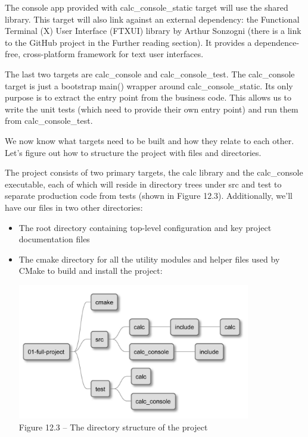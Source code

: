 The console app provided with calc\_console\_static target will use the shared library. This target will also link against an external dependency: the Functional Terminal (X) User Interface (FTXUI) library by Arthur Sonzogni (there is a link to the GitHub project in the Further reading section). It provides a dependence-free, cross-platform framework for text user interfaces.

The last two targets are calc\_console and calc\_console\_test. The calc\_console target is just a bootstrap main() wrapper around calc\_console\_static. Its only purpose is to extract the entry point from the business code. This allows us to write the unit tests (which need to provide their own entry point) and run them from calc\_console\_test.

We now know what targets need to be built and how they relate to each other. Let's figure out how to structure the project with files and directories.


The project consists of two primary targets, the calc library and the calc\_console executable, each of which will reside in directory trees under src and test to separate production code from tests (shown in Figure 12.3). Additionally, we'll have our files in two other directories:

\begin{itemize}
\item 
The root directory containing top-level configuration and key project documentation files

\item 
The cmake directory for all the utility modules and helper files used by CMake to build and install the project:

\begin{center}
\includegraphics[width=0.8\textwidth]{content/3/chapter12/images/3.jpg}\\
Figure 12.3 – The directory structure of the project
\end{center}
\end{itemize}

